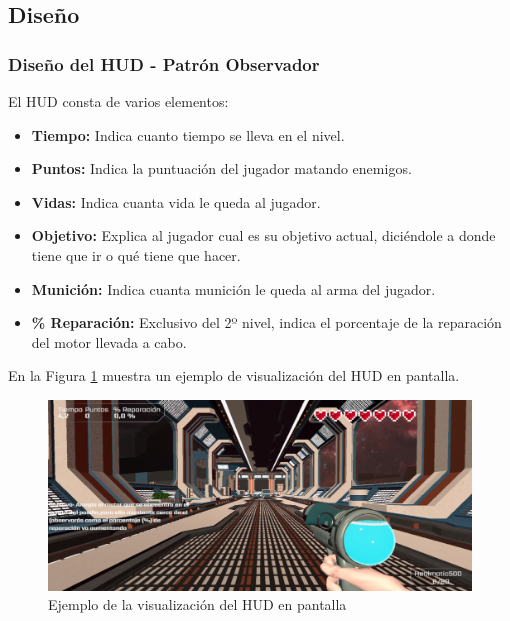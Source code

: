 \subsection{Diseño}

\subsubsection{Diseño del HUD - Patrón Observador}
El HUD consta de varios elementos:
\begin{itemize}
	\item \textbf{Tiempo:} Indica cuanto tiempo se lleva en el nivel.
	\item \textbf{Puntos:} Indica la puntuación del jugador matando enemigos.
	\item \textbf{Vidas:} Indica cuanta vida le queda al jugador.
	\item \textbf{Objetivo:} Explica al jugador cual es su objetivo actual, diciéndole a donde tiene que ir o qué tiene que hacer.
	\item \textbf{Munición:} Indica cuanta munición le queda al arma del jugador.
	\item \textbf{\% Reparación:} Exclusivo del 2º nivel, indica el porcentaje de la reparación del motor llevada a cabo.
\end{itemize}

En la Figura \ref{fig:PantallaHUD3D} muestra un ejemplo de visualización del HUD en pantalla.

\begin{figure}[H]
	\centering
	\includegraphics[scale=0.45]{imagenes/PantallaHUD3D.png}
	\caption{\label{fig:PantallaHUD3D}Ejemplo de la visualización del HUD en pantalla}
\end{figure}

